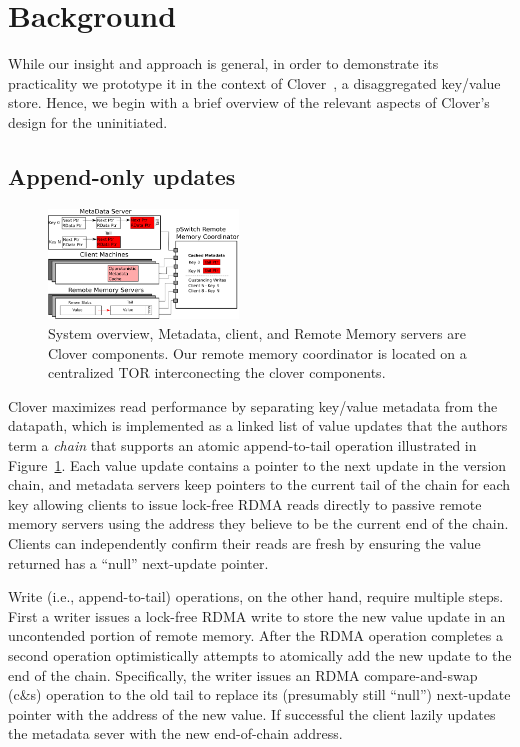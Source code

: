 \section{Background}

While our insight and approach is general, in order to demonstrate its
practicality we prototype it in the context of Clover~\cite{clover}, a
disaggregated key/value store.  Hence, we begin with a brief overview
of the relevant aspects of Clover's design for the uninitiated.

\subsection{Append-only updates}

\begin{figure}
    \includegraphics[width=0.45\textwidth]{fig/overview_2.png}
    \caption{ System overview, Metadata, client, and Remote Memory
    servers are Clover components. Our remote memory coordinator is
    located on a centralized TOR interconecting the clover components.
    }
    \label{fig:overview} 
\end{figure}

Clover maximizes read performance by separating key/value metadata
from the datapath, which is implemented as a linked list of value
updates that the authors term a \emph{chain} that supports an atomic
append-to-tail operation illustrated in Figure~\ref{fig:overview}.
Each value update contains a pointer to the next update in the version
chain, and metadata servers keep pointers to the current tail of the
chain for each key allowing clients to issue lock-free RDMA reads
directly to passive remote memory servers using the address they
believe to be the current end of the chain.  Clients can independently
confirm their reads are fresh by ensuring the value returned has a
``null'' next-update pointer.

Write (i.e., append-to-tail) operations, on the other hand, require
multiple steps.  First a writer issues a lock-free RDMA write to store
the new value update in an uncontended portion of remote
memory. After the RDMA operation completes a second operation
optimistically attempts to atomically add the new update to the end of
the chain.  Specifically, the writer issues an RDMA compare-and-swap
(c\&s) operation to the old tail to replace its (presumably still
``null'') next-update pointer with the address of the new value.  If
successful the client lazily updates the metadata sever with the
new end-of-chain address.

